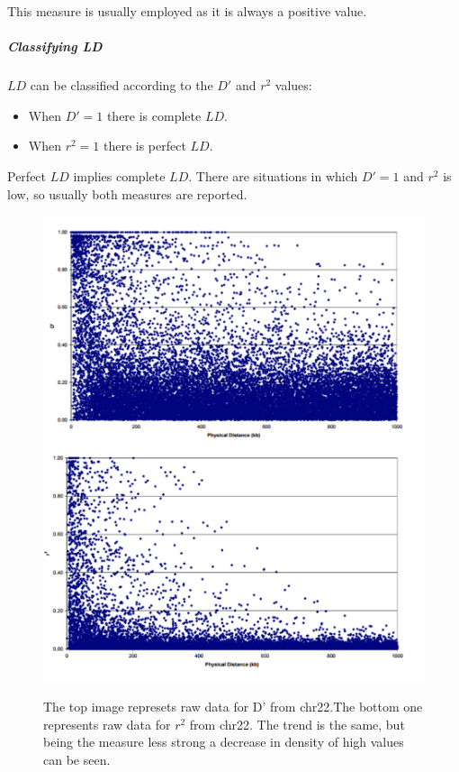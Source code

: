 				This measure is usually employed as it is always a positive value.

				\subparagraph{Classifying LD}
				$LD$ can be classified according to the $D'$ and $r^2$ values:

				\begin{multicols}{2}
					\begin{itemize}
						\item When $D'= 1$ there is complete $LD$.
						\item When $r^2 = 1$ there is perfect $LD$.
					\end{itemize}
				\end{multicols}

				Perfect $LD$ implies complete $LD$.
				There are situations in which $D'=1$ and $r^2$ is low, so usually both measures are reported.

				\begin{figure}[H]
				\centering
				\includegraphics[scale=0.25]{d22}
				\includegraphics[scale=0.25]{r22}
				\caption{The top image represets raw data for D' from chr22.The bottom one represents raw data for $r^2$ from chr22. The trend is the same, but being the measure less strong a decrease in density of high values can be seen.}
				\label{fig:compare}
				\end{figure}

